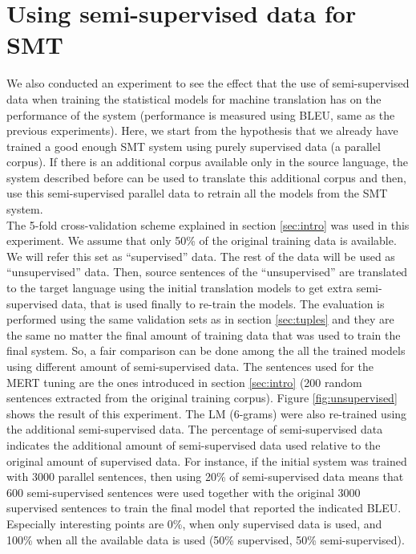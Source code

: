 \documentclass[10pt,a4paper]{article}
\begin{document}
\section{Using semi-supervised data for SMT}
We also conducted an experiment to see the effect that the use of semi-supervised data when training the statistical models for machine translation has on the performance of the system (performance is measured using BLEU, same as the previous experiments). Here, we start from the hypothesis that we already have trained a good enough SMT system using purely supervised data (a parallel corpus). If there is an additional corpus available only in the source language, the system described before can be used to translate this additional corpus and then, use this semi-supervised parallel data to retrain all the models from the SMT system.\\

The 5-fold cross-validation scheme explained in section \ref{sec:intro} was used in this experiment. We assume that only 50\% of the original training data is available. We will refer this set as ``supervised'' data. The rest of the data will be used as ``unsupervised'' data. Then, source sentences of the ``unsupervised'' are translated to the target language using the initial translation models to get extra semi-supervised data, that is used finally to re-train the models. The evaluation is performed using the same validation sets as in section \ref{sec:tuples} and they are the same no matter the final amount of training data that was used to train the final system. So, a fair comparison can be done among the all the trained models using different amount of semi-supervised data. The sentences used for the MERT tuning are the ones introduced in section \ref{sec:intro} (200 random sentences extracted from the original training corpus). Figure \ref{fig:unsupervised} shows the result of this experiment. The LM ($6$-grams) were also re-trained using the additional semi-supervised data. The percentage of semi-supervised data indicates the additional amount of semi-supervised data used relative to the original amount of supervised data. For instance, if the initial system was trained with 3000 parallel sentences, then using 20\% of semi-supervised data means that 600 semi-supervised sentences were used together with the original 3000 supervised sentences to train the final model that reported the indicated BLEU. Especially interesting points are 0\%, when only supervised data is used, and 100\% when all the available data is used (50\% supervised, 50\% semi-supervised).\\
\end{document}
